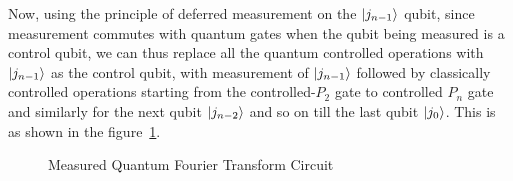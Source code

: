 Now, using the principle of deferred measurement on the $\ket{j_{n-1}}$ qubit, since measurement commutes with quantum gates when the qubit being measured is a control qubit, we can thus replace all the quantum controlled operations with $\ket{j_{n-1}}$ as the control qubit, with measurement of $\ket{j_{n-1}}$ followed by classically controlled operations starting from the controlled-$P_2$ gate to controlled $P_n$ gate and similarly for the next qubit $\ket{j_{n-2}}$ and so on till the last qubit $\ket{j_0}$. This is as shown in the figure~\ref{fig:meas_QFT}.
\begin{figure}[ht]
    \centering
    \caption{Measured Quantum Fourier Transform Circuit}
    \label{fig:meas_QFT}
\end{figure}
